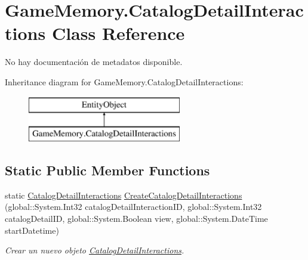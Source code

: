 \hypertarget{class_game_memory_1_1_catalog_detail_interactions}{\section{Game\-Memory.\-Catalog\-Detail\-Interactions Class Reference}
\label{class_game_memory_1_1_catalog_detail_interactions}
}


No hay documentación de metadatos disponible.  


Inheritance diagram for Game\-Memory.\-Catalog\-Detail\-Interactions\-:\begin{figure}[H]
\begin{center}
\leavevmode
\includegraphics[height=2.000000cm]{class_game_memory_1_1_catalog_detail_interactions}
\end{center}
\end{figure}
\subsection*{Static Public Member Functions}
\begin{DoxyCompactItemize}
\item 
static \hyperlink{class_game_memory_1_1_catalog_detail_interactions}{Catalog\-Detail\-Interactions} \hyperlink{class_game_memory_1_1_catalog_detail_interactions_a334021a70e2896564978fc2ded9e451c}{Create\-Catalog\-Detail\-Interactions} (global\-::\-System.\-Int32 catalog\-Detail\-Interaction\-I\-D, global\-::\-System.\-Int32 catalog\-Detail\-I\-D, global\-::\-System.\-Boolean view, global\-::\-System.\-Date\-Time start\-Datetime)
\begin{DoxyCompactList}\small\item\em Crear un nuevo objeto \hyperlink{class_game_memory_1_1_catalog_detail_interactions}{Catalog\-Detail\-Interactions}. \end{DoxyCompactList}\end{DoxyCompactItemize}
